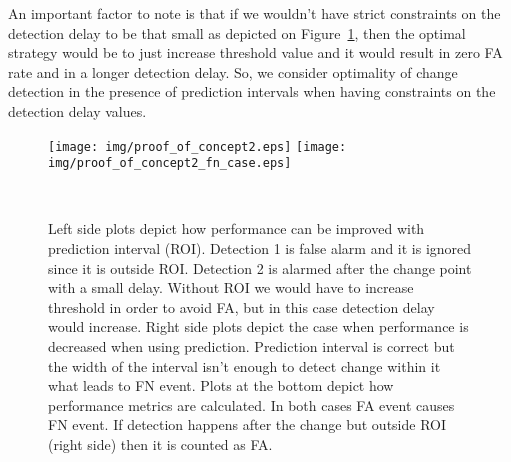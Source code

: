 An important factor to note is that if we wouldn't have strict constraints on the detection delay to be that small as depicted on Figure~\ref{fig:possible_outcomes}, then the optimal strategy would be to just increase threshold value and it would result in zero FA rate and in a longer detection delay.
So, we consider optimality of change detection in the presence of prediction intervals when having constraints on the detection delay values.
\begin{figure}[!htb]
	\begin{minipage}[t]{1.0\textwidth}
    \centering
    \texttt{[image: img/proof\_of\_concept2.eps]}
    \texttt{[image: img/proof\_of\_concept2\_fn\_case.eps]}
    \\
		
    \hspace{10mm}
		
		\caption{
    Left side plots depict how performance can be improved with prediction interval (ROI). 
    Detection 1 is false alarm and it is ignored since it is outside ROI. 
    Detection 2 is alarmed after the change point with a small delay. 
    Without ROI we would have to increase threshold in order to avoid FA, but in this case detection delay would increase.
    Right side plots depict the case when performance is decreased when using prediction. Prediction interval is correct but the width of the interval isn't enough to detect change within it what leads to FN event. 
    Plots at the bottom depict how performance metrics are calculated.
    In both cases FA event causes FN event.
    If detection happens after the change but outside ROI (right side) then it is counted as FA.
    }~\label{fig:possible_outcomes}
	\end{minipage}
\end{figure}
